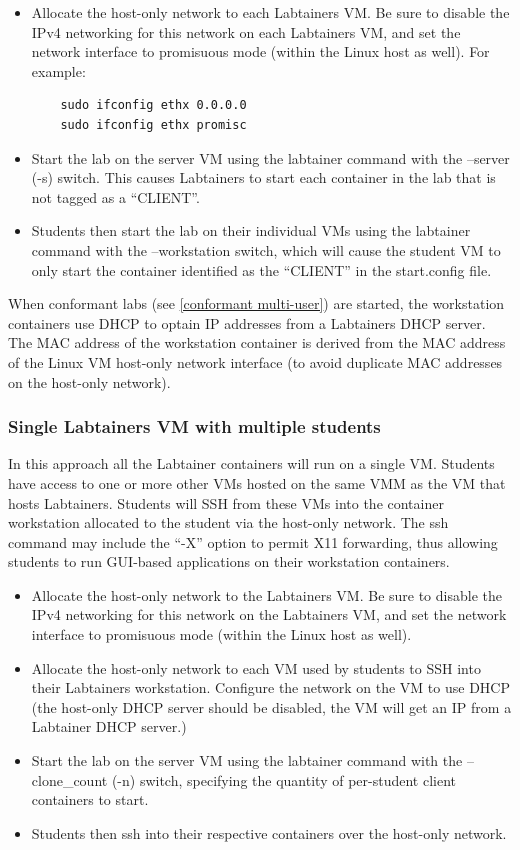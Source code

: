 \documentclass[12pt]{article}
\begin{document}
\begin{itemize}
\item Allocate the host-only network to each Labtainers VM.  Be sure
to disable the IPv4 networking for this network on each Labtainers VM, and
set the network interface to promisuous mode (within the Linux host as well).
For example:
\begin{verbatim}
    sudo ifconfig ethx 0.0.0.0
    sudo ifconfig ethx promisc
\end{verbatim} 

\item Start the lab on the server VM using the labtainer command with the --server (-s) switch. This
causes Labtainers to start each container in the lab that is not tagged as a ``CLIENT''. 

\item Students then
start the lab on their individual VMs using the labtainer command with the --workstation switch, which will cause
the student VM to only start the container identified as the ``CLIENT'' in the start.config file.
\end{itemize}

When conformant labs (see \ref{conformant multi-user}) are started, the workstation containers 
use DHCP to optain IP addresses from a Labtainers DHCP server.  The MAC address of the workstation
container is derived from the MAC address of the Linux VM host-only network interface (to avoid
duplicate MAC addresses on the host-only network). 

\subsubsection {Single Labtainers VM with multiple students}
In this approach all the Labtainer containers will run on a single VM.  
Students have access to one or more other
VMs hosted on the same VMM as the VM that hosts Labtainers. Students will SSH from these VMs into the container workstation
allocated to the student via the host-only network.  The ssh command may include the ``-X'' option to permit X11 forwarding, thus allowing students to
run GUI-based applications on their workstation containers.

\begin{itemize}
\item Allocate the host-only network to the Labtainers VM. Be sure
to disable the IPv4 networking for this network on the Labtainers VM, and
set the network interface to promisuous mode (within the Linux host as well).
\item Allocate the host-only network to each VM used by students to SSH into their
Labtainers workstation.  Configure the network on the VM to use DHCP (the host-only
DHCP server should be disabled, the VM will get an IP from a Labtainer DHCP server.)

\item Start the lab on the server VM using the labtainer command with the --clone\_count (-n) switch,
specifying the quantity of per-student client containers to start.

\item Students then ssh into their respective containers over the host-only network.
\end{itemize}
\end{document}
